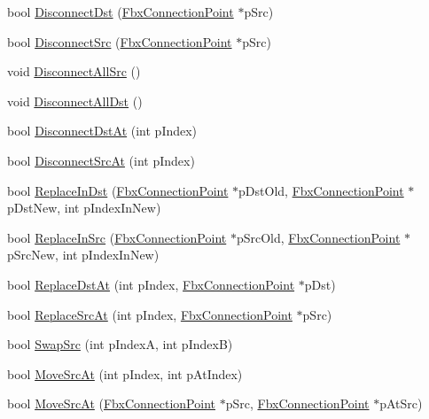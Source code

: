 \begin{DoxyCompactItemize}
\item 
bool \hyperlink{class_fbx_connection_point_ade6b167741d19d0604d66647aa5d3b15}{Disconnect\+Dst} (\hyperlink{class_fbx_connection_point}{Fbx\+Connection\+Point} $\ast$p\+Src)
\item 
bool \hyperlink{class_fbx_connection_point_a7580e157a26caa41ab27db4d99901275}{Disconnect\+Src} (\hyperlink{class_fbx_connection_point}{Fbx\+Connection\+Point} $\ast$p\+Src)
\item 
void \hyperlink{class_fbx_connection_point_a94f160e3009bde0af455acb8e9e6fd0e}{Disconnect\+All\+Src} ()
\item 
void \hyperlink{class_fbx_connection_point_abae6ad96d1a36e83d2eb870ca121b885}{Disconnect\+All\+Dst} ()
\item 
bool \hyperlink{class_fbx_connection_point_a28702487dafda6125019c00ad801a476}{Disconnect\+Dst\+At} (int p\+Index)
\item 
bool \hyperlink{class_fbx_connection_point_a65c3abd9aa504a3067529412fa4f1350}{Disconnect\+Src\+At} (int p\+Index)
\item 
bool \hyperlink{class_fbx_connection_point_ae1d8edf287d969906c1dd1cc4e666df9}{Replace\+In\+Dst} (\hyperlink{class_fbx_connection_point}{Fbx\+Connection\+Point} $\ast$p\+Dst\+Old, \hyperlink{class_fbx_connection_point}{Fbx\+Connection\+Point} $\ast$p\+Dst\+New, int p\+Index\+In\+New)
\item 
bool \hyperlink{class_fbx_connection_point_a89908a3270dbf639a9973c8271d7a6ad}{Replace\+In\+Src} (\hyperlink{class_fbx_connection_point}{Fbx\+Connection\+Point} $\ast$p\+Src\+Old, \hyperlink{class_fbx_connection_point}{Fbx\+Connection\+Point} $\ast$p\+Src\+New, int p\+Index\+In\+New)
\item 
bool \hyperlink{class_fbx_connection_point_ad7a2a088589958e0f7d85eb39c1fc173}{Replace\+Dst\+At} (int p\+Index, \hyperlink{class_fbx_connection_point}{Fbx\+Connection\+Point} $\ast$p\+Dst)
\item 
bool \hyperlink{class_fbx_connection_point_af8ba06b0d09dd64c237a88c99caa5ff6}{Replace\+Src\+At} (int p\+Index, \hyperlink{class_fbx_connection_point}{Fbx\+Connection\+Point} $\ast$p\+Src)
\item 
bool \hyperlink{class_fbx_connection_point_a0a26176bfcdd1edaf60a64afa3aa4f16}{Swap\+Src} (int p\+IndexA, int p\+IndexB)
\item 
bool \hyperlink{class_fbx_connection_point_abc82c5b4c5c5c9b1d4ab59662cb13e7e}{Move\+Src\+At} (int p\+Index, int p\+At\+Index)
\item 
bool \hyperlink{class_fbx_connection_point_a23302c72f75632bec8b48f3f3fe8e783}{Move\+Src\+At} (\hyperlink{class_fbx_connection_point}{Fbx\+Connection\+Point} $\ast$p\+Src, \hyperlink{class_fbx_connection_point}{Fbx\+Connection\+Point} $\ast$p\+At\+Src)

\end{DoxyCompactItemize}
